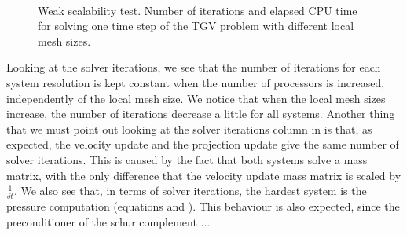 \begin{figure}[p]
  \\
  \caption{Weak scalability test. Number of iterations and elapsed CPU time for solving one time step of the TGV problem with different local mesh sizes.}
  \label{fig-TGV_SRK_scal}
\end{figure}

Looking at the solver iterations, we see that the number of iterations for each system resolution is kept constant when the number of processors is increased, independently of the local mesh size. We notice that when the local mesh sizes increase, the number of iterations decrease a little for all systems. Another thing that we must point out looking at the solver iterations column in  is that, as expected, the velocity update and the projection update give the same number of solver iterations. This is caused by the fact that both systems solve a mass matrix, with the only difference that the velocity update mass matrix is scaled by $ \frac{1}{\delta t} $. We also see that, in terms of solver iterations, the hardest system is the pressure computation (equations  and ). This behaviour is also expected, since the preconditioner of the schur complement ...

